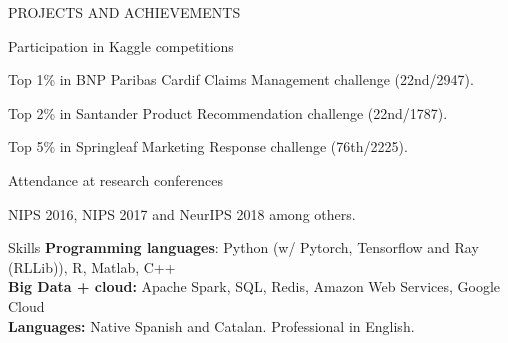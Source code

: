 \documentclass{resume} %
\begin{document}
\begin{rSection}{PROJECTS AND ACHIEVEMENTS}
\vspace{-6pt}

\begin{rSubsection}{Participation in Kaggle competitions}
{}{}{}  

\vspace{-3pt}

\item Top 1\% in BNP Paribas Cardif Claims Management challenge (22nd/2947).
\item Top 2\% in Santander Product Recommendation challenge (22nd/1787).
\item Top 5\% in Springleaf Marketing Response challenge (76th/2225).

\end{rSubsection}

\vspace{-6pt}

\begin{rSubsection}{Attendance at research conferences}{}{}{}  

\vspace{-3pt}

 \item NIPS 2016, NIPS 2017 and NeurIPS 2018 among others.

\end{rSubsection}

\end{rSection} 



\begin{rSection}{Skills} \itemsep -3pt  
{\textbf{Programming languages}: Python (w/ Pytorch, Tensorflow and Ray (RLLib)), R, Matlab, C++ }  \\
{\textbf{Big Data + cloud:} Apache Spark, SQL, Redis, Amazon Web Services, Google Cloud } \\
{\textbf{Languages:} Native Spanish and Catalan. Professional in English.}
\end{rSection}  
 
\vspace{\fill}



\end{document}
